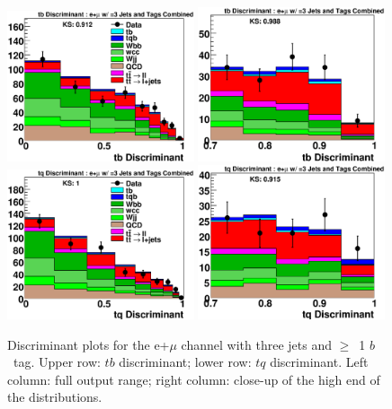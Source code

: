 \vspace{-0.05in}
\begin{figure}[!h!tbp]
\includegraphics[width=0.49\textwidth]
{eps/MatrixElement/output/3jet/All_tb_Discriminant.eps}
\includegraphics[width=0.49\textwidth]
{eps/MatrixElement/output/3jet/All_tb_Discriminant_Zoom.eps}
\includegraphics[width=0.49\textwidth]
{eps/MatrixElement/output/3jet/All_tq_Discriminant.eps}
\includegraphics[width=0.49\textwidth]
{eps/MatrixElement/output/3jet/All_tq_Discriminant_Zoom.eps}
\vspace{-0.1in}
\caption{Discriminant plots for the e+$\mu$ channel with three jets
and $\geq$~1 $b$~tag. Upper row: $tb$ discriminant; lower row: $tq$
discriminant. Left column: full output range; right column: close-up
of the high end of the distributions.}
\label{e21_3j}
\end{figure}


